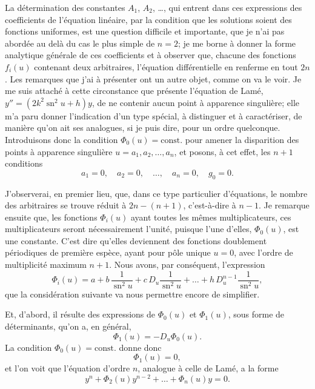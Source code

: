 \documentclass[11pt,leqno,oneside,letterpaper]{book}[2005/09/16]
\DeclareMathOperator{\sn}{sn}
\begin{document}
La d\'etermination des constantes $A_1$, $A_2$, \ldots, qui entrent dans ces expressions
des coefficients de l'\'equation lin\'eaire, par la condition que les
solutions soient des fonctions uniformes, est une question difficile et importante,
que je n'ai pas abord\'ee au del\`a du cas le plus simple de $n = 2$;
je me borne \`a donner la forme analytique g\'en\'erale de ces coefficients et \`a
observer que, chacune des fonctions $f_i(u)$ contenant deux arbitraires, l'\'equation
diff\'erentielle en renferme en tout $2n$. Les remarques que j'ai \`a pr\'esenter
ont un autre objet, comme on va le voir. Je me suis attach\'e \`a cette circonstance
que pr\'esente l'\'equation de Lam\'e, $y'' = (2k^2 \sn^2 u + h)y$, de ne
contenir aucun point \`a apparence singuli\`ere; elle m'a paru donner l'indication
d'un type sp\'ecial, \`a distinguer et \`a caract\'eriser, de mani\`ere qu'on
ait ses analogues, si je puis dire, pour un ordre quelconque. Introduisons
donc la condition $\Phi_0(u)=\textrm{const.}$ pour amener la disparition des points
\`a apparence singuli\`ere $u=a_1, a_2, \ldots, a_n$, et posons, \`a cet effet, les $n + 1$
conditions
\[
  a_1=0, \quad a_2=0, \quad \ldots, \quad a_n=0, \quad g_0=0.
\]
\medskip

J'observerai, en premier lieu, que, dans ce type particulier d'\'equations,
le nombre des arbitraires se trouve r\'eduit \`a $2n-(n+1)$, c'est-\`a-dire
\`a $n-1$. Je remarque ensuite que, les fonctions $\Phi_i(u)$ ayant toutes les m\^emes
multiplicateurs, ces multiplicateurs seront n\'ecessairement l'unit\'e, puisque
l'une d'elles, $\Phi_0(u)$, est une constante. C'est dire qu'elles deviennent des
fonctions doublement p\'eriodiques de premi\`ere esp\`ece, ayant pour p\^ole
unique $u=0$, avec l'ordre de multiplicit\'e maximum $n+1$. Nous avons,
par cons\'equent, l'expression
\[
  \Phi_i(u) = a + b\, \frac{1}{\sn^2 u} + c\, D_u \frac{1}{\sn^2 u}
    + \ldots + h\, D^{n-1}_u \frac{1}{\sn^2 u},
\]
que la consid\'eration suivante va nous permettre encore de simplifier.

Et, d'abord, il r\'esulte des expressions de $\Phi_0(u)$ et $\Phi_1(u)$, sous forme
de d\'eterminants, qu'on a, en g\'en\'eral,
\[
\Phi_1(u) = -D_u\Phi_0(u).
\]
La condition $\Phi_0(u) = \textrm{const.}$ donne donc
\[
\Phi_1(u) = 0,
\]
et l'on voit que l'\'equation d'ordre $n$, analogue \`a celle de Lam\'e, a la forme
\[
y^n + \Phi_2(u)y^{n-2} + \ldots + \Phi_n(u)y = 0.
\]
\end{document}
